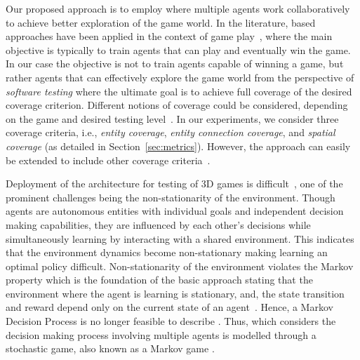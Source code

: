 Our proposed approach is to employ \marlacronym where multiple agents work collaboratively to achieve better exploration of the game world. In the literature, \marlacronym based approaches have been applied in the context of game play~\cite{OpenAIHideandSeekbaker2019,vinyals2019grandmasterStarCraft,park2019multi,zhou2021hierarchical}, where the main objective is typically to train agents that can play and eventually win the game. 
In our case the objective is not to train agents capable of winning a game, but rather agents that can effectively explore the game world from the perspective of \emph{software testing} where the ultimate goal is to achieve full coverage of the desired coverage criterion. Different notions of coverage could be considered, depending on the game and desired testing level~\cite{10.1145/3643658.3643920}. In our experiments, we consider three coverage criteria, i.e., \emph{entity coverage}, \emph{entity connection coverage}, and \emph{spatial coverage} (as detailed in Section~\ref{sec:metrics}). However, the approach can easily be extended to include other coverage criteria~\cite{10.1145/3643658.3643920}.

Deployment of the \marlacronym architecture for testing of 3D games is  difficult~\cite{canese2021multi}, 
one of the prominent challenges being the non-stationarity of the environment. 
Though \marlacronym agents are autonomous entities with individual goals and independent decision making capabilities, they are influenced by each other's decisions while simultaneously learning by interacting with a shared environment. 
This indicates that the environment dynamics become non-stationary making learning an optimal policy difficult. 
Non-stationarity of the environment violates the Markov property which is the foundation of the basic \rlacronym approach stating that the environment where the agent is learning is stationary, and, the state transition and reward depend only on the current state of an agent~\cite{sutton2018reinforcement}. Hence, a Markov Decision Process \cite{bellman1957markovian} is no longer feasible to describe \marlacronym. Thus, \marlacronym which considers the decision making process involving multiple agents is modelled through a stochastic game, also known as a Markov game \cite{littman1994markov}. 


